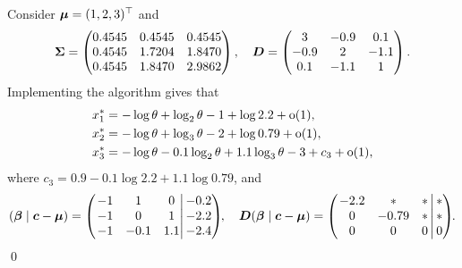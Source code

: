 \begin{example}
Consider $\bm{\mu}=(1,2,3)^\top$ and
\[\bm{\Sigma} = \begin{pmatrix}
            0.4545 & 0.4545 & 0.4545 \\
            0.4545 & 1.7204 & 1.8470 \\
            0.4545 & 1.8470 & 2.9862
        \end{pmatrix}, \quad \bm{D} =\begin{pmatrix}
            3 & -0.9 & 0.1 \\
            -0.9 & 2 & -1.1 \\
            0.1 & -1.1 & 1
        \end{pmatrix} . \]
Implementing the algorithm gives that
\begin{align*}
    x_1^* &= -\log \theta + \log_2 \theta -1 +\log 2.2 + {\mathrm{o}}(1) , \\
    x_2^* &= -\log \theta + \log_3 \theta -2 +\log 0.79 + {\mathrm{o}}(1) , \\
    x_3^* &= -\log \theta -0.1\log_2 \theta + 1.1 \log_3 \theta -3 + c_3 + {\mathrm{o}}(1) ,
\end{align*}
where $c_{3} = 0.9 -0.1 \log 2.2 + 1.1 \log 0.79$, and
\[
(\bm{\beta} \mid \bm{c}-\bm{\mu}) = \left(\left.\begin{matrix}
            -1 & 1 & 0\\
            -1 & 0 & 1\\
            -1 & -0.1 & 1.1
        \end{matrix}\right|
        \begin{matrix}-0.2\\-2.2\\-2.4\end{matrix}\right)\negthickspace ,\quad
    \bm{D} (\bm{\beta} \mid \bm{c}-\bm{\mu}) = \left(\left.\begin{matrix}
            -2.2 & * & *\,\\
            0 & -0.79 & *\,\\
            0 & 0 & 0\,
    \end{matrix}\right|
    \begin{matrix}*\\ *\\0\end{matrix}\right)\negthickspace.
\]
\qed
\end{example}

